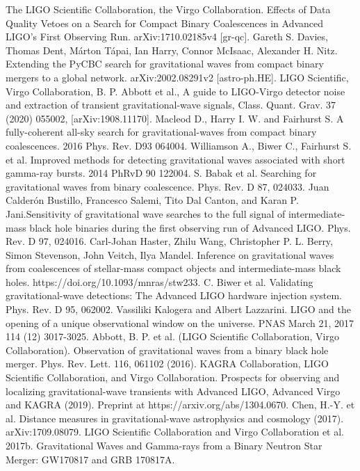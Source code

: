 \documentclass[binding=0.6cm, LaM]{sapthesis}
\begin{document}
\begin{thebibliography}{500}
	 The LIGO Scientific Collaboration, the Virgo Collaboration. Effects of Data Quality Vetoes on a Search for Compact Binary Coalescences in Advanced LIGO's First Observing Run. arXiv:1710.02185v4 [gr-qc].
	 Gareth S. Davies, Thomas Dent, Márton Tápai, Ian Harry, Connor McIsaac, Alexander H. Nitz. Extending the PyCBC search for gravitational waves from compact binary mergers to a global network. arXiv:2002.08291v2 [astro-ph.HE].
	 LIGO Scientific, Virgo Collaboration, B. P. Abbott et al., A guide to LIGO-Virgo detector noise and extraction of transient gravitational-wave signals, Class. Quant. Grav. 37 (2020) 055002, [arXiv:1908.11170]. 
	 Macleod D., Harry I. W. and Fairhurst S. A fully-coherent all-sky search for gravitational-waves from compact binary coalescences. 2016 Phys. Rev. D93 064004. 
	 Williamson A., Biwer C., Fairhurst S. et al. Improved methods for detecting gravitational waves associated with short gamma-ray bursts. 2014 PhRvD 90 122004.
	 S. Babak et al. Searching for gravitational waves from binary coalescence. Phys. Rev. D 87, 024033.
	 Juan Calderón Bustillo, Francesco Salemi, Tito Dal Canton, and Karan P. Jani.Sensitivity of gravitational wave searches to the full signal of intermediate-mass black hole binaries during the first observing run of Advanced LIGO. Phys. Rev. D 97, 024016.
	 Carl-Johan Haster, Zhilu Wang, Christopher P. L. Berry, Simon Stevenson, John Veitch, Ilya Mandel. Inference on gravitational waves from coalescences of stellar-mass compact objects and intermediate-mass black holes. https://doi.org/10.1093/mnras/stw233.
	 C. Biwer et al. Validating gravitational-wave detections: The Advanced LIGO hardware injection system. Phys. Rev. D 95, 062002.
	 Vassiliki Kalogera and Albert Lazzarini. LIGO and the opening of a unique observational window on the universe. PNAS March 21, 2017 114 (12) 3017-3025.
	 Abbott, B. P. et al. (LIGO Scientific Collaboration, Virgo Collaboration). Observation of gravitational waves from a binary black hole merger. Phys. Rev. Lett. 116, 061102 (2016).
	 KAGRA Collaboration, LIGO Scientific Collaboration, and Virgo Collaboration. Prospects for observing and localizing gravitational-wave transients with Advanced LIGO, Advanced Virgo and KAGRA (2019). Preprint at https://arxiv.org/abs/1304.0670. 
          Chen, H.-Y. et al. Distance measures in gravitational-wave astrophysics and cosmology (2017). arXiv:1709.08079.
	 LIGO Scientific Collaboration and Virgo Collaboration et al. 2017b. Gravitational Waves and Gamma-rays from a Binary Neutron Star Merger: GW170817 and GRB 170817A.

\end{thebibliography}
\end{document}
